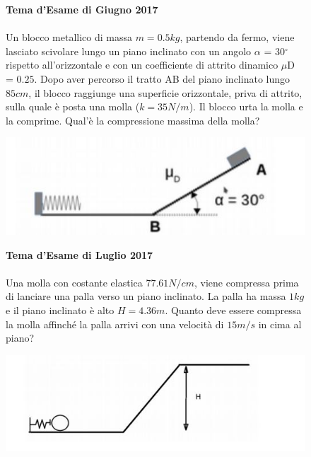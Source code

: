 \begin{figure}[h!]
\textbf{Tema d'Esame di Giugno 2017}\\ \\
Un blocco metallico di massa $m = 0.5 kg$, partendo da fermo, viene lasciato
scivolare lungo un piano inclinato con un angolo $\alpha$ = 30$^{\circ}$ rispetto all’orizzontale e con un coefficiente di attrito dinamico $\mu$D = $0.25$. Dopo aver percorso il tratto AB del piano inclinato lungo $85 cm$, il blocco raggiunge una superficie orizzontale, priva di attrito, sulla quale è posta una molla ($k = 35 N/m$). Il blocco urta la molla e la comprime. Qual’è la compressione massima della molla?
\\
	\begin{center}
		\includegraphics[scale=0.5]{ES2/GIU022017.jpg}
	\end{center}
\end{figure}

\begin{figure}[h!]
\textbf{Tema d'Esame di Luglio 2017}\\ \\
Una molla con costante elastica $77.61 N/cm$, viene compressa prima di lanciare una palla verso un piano inclinato. La palla ha massa $1 kg$ e il piano inclinato è alto $H = 4.36 m$. Quanto deve essere compressa la molla affinché la palla arrivi con una velocità di $15 m/s$ in cima al piano?
\\
	\begin{center}
		\includegraphics[scale=0.6]{ES2/LUG022017.jpg}
	\end{center}
\end{figure}


